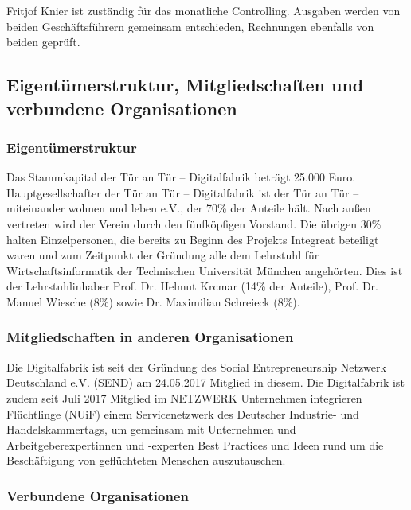 \documentclass[12pt, a4paper]{article} %
\begin{document}
Fritjof Knier ist zuständig für das monatliche Controlling. Ausgaben
werden von beiden Geschäftsführern gemeinsam entschieden, Rechnungen
ebenfalls von beiden geprüft.

\hypertarget{eigentuxfcmerstruktur-mitgliedschaften-und-verbundene-organisationen}{%
\subsection{Eigentümerstruktur, Mitgliedschaften und verbundene
Organisationen}\label{eigentuxfcmerstruktur-mitgliedschaften-und-verbundene-organisationen}}

\hypertarget{eigentuxfcmerstruktur}{%
\subsubsection{Eigentümerstruktur}\label{eigentuxfcmerstruktur}}

Das Stammkapital der Tür an Tür – Digitalfabrik beträgt 25.000 Euro.
Hauptgesellschafter der Tür an Tür – Digitalfabrik ist der Tür an Tür –
miteinander wohnen und leben e.V., der 70\% der Anteile hält. Nach außen
vertreten wird der Verein durch den fünfköpfigen Vorstand. Die übrigen
30\% halten Einzelpersonen, die bereits zu Beginn des Projekts Integreat
beteiligt waren und zum Zeitpunkt der Gründung alle dem Lehrstuhl für
Wirtschaftsinformatik der Technischen Universität München angehörten.
Dies ist der Lehrstuhlinhaber Prof. Dr. Helmut Krcmar (14\% der
Anteile), Prof. Dr. Manuel Wiesche (8\%) sowie Dr. Maximilian Schreieck
(8\%).

\hypertarget{mitgliedschaften-in-anderen-organisationen}{%
\subsubsection{Mitgliedschaften in anderen
Organisationen}\label{mitgliedschaften-in-anderen-organisationen}}

Die Digitalfabrik ist seit der Gründung des Social Entrepreneurship
Netzwerk Deutschland e.V. (SEND) am 24.05.2017 Mitglied in diesem. Die
Digitalfabrik ist zudem seit Juli 2017 Mitglied im NETZWERK Unternehmen
integrieren Flüchtlinge (NUiF) einem Servicenetzwerk des Deutscher
Industrie- und Handelskammertags, um gemeinsam mit Unternehmen und
Arbeitgeberexpertinnen und -experten Best Practices und Ideen rund um
die Beschäftigung von geflüchteten Menschen auszutauschen.

\hypertarget{verbundene-organisationen}{%
\subsubsection{Verbundene
Organisationen}\label{verbundene-organisationen}}
\end{document}
